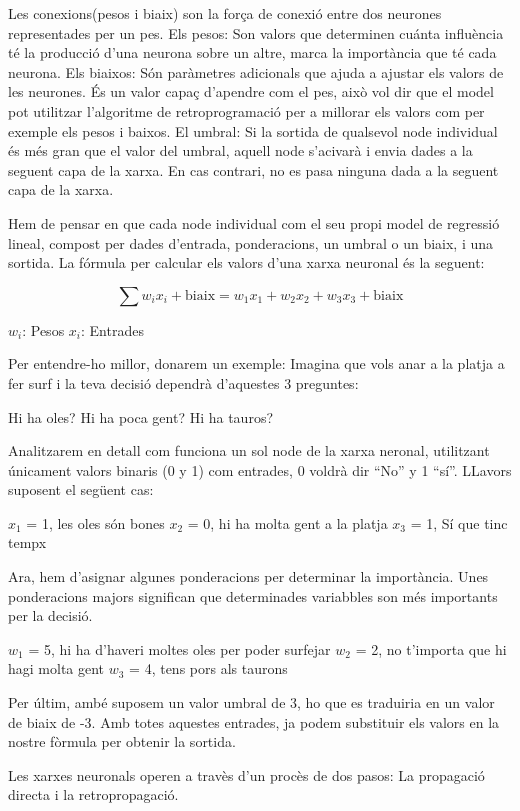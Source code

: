 Les conexions(pesos i biaix) son la força de conexió entre dos neurones representades per un pes.
Els pesos: Son valors que determinen cuánta influència té la producció d'una neurona sobre un altre, marca la importància que té cada neurona.
Els biaixos: Són paràmetres adicionals que ajuda a ajustar els valors de les neurones. És un valor capaç d'apendre com el pes, això vol dir que el model pot utilitzar l'algoritme de retroprogramació per a millorar els valors com per exemple els pesos i baixos.
El umbral: Si la sortida de qualsevol node individual és més gran que el valor del umbral, aquell node s'acivarà i envia dades a la seguent capa de la xarxa. En cas contrari, no es pasa ninguna dada a la seguent capa de la xarxa.

Hem de pensar en que cada node individual com el seu propi model de regressió lineal, compost per dades d'entrada, ponderacions, un umbral o un biaix, i una sortida. La fórmula per calcular els valors d'una xarxa neuronal és la seguent:

\[
\sum w_i x_i + \text{biaix} = w_1 x_1 + w_2 x_2 + w_3 x_3 + \text{biaix}
\]

$w_i$: Pesos
$x_i$: Entrades


Per entendre-ho millor, donarem un exemple: Imagina que vols anar a la platja a fer surf i la teva decisió dependrà d'aquestes 3 preguntes:

Hi ha oles?
Hi ha poca gent?
Hi ha tauros?

Analitzarem en detall com funciona un sol node de la xarxa neronal, utilitzant únicament valors binaris (0 y 1) com entrades, 0 voldrà dir ``No'' y 1 ``sí''.
LLavors suposent el següent cas:

$x_1$ = 1, les oles són bones
$x_2$ = 0, hi ha molta gent a la platja
$x_3$ = 1, Sí que tinc tempx

Ara, hem d'asignar algunes ponderacions per determinar la importància. Unes ponderacions majors significan que determinades variabbles son més importants per la decisió.

$w_1$ = 5, hi ha d'haveri moltes oles per poder surfejar
$w_2$ = 2, no t'importa que hi hagi molta gent
$w_3$ = 4, tens pors als taurons

Per últim, ambé suposem un valor umbral de 3, ho que es traduiria en un valor de biaix de -3. Amb totes aquestes entrades, ja podem substituir els valors en la nostre fòrmula per obtenir la sortida.



Les xarxes neuronals operen a travès d'un procès de dos pasos: La propagació directa i la retropropagació.


